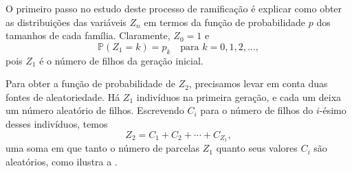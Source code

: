 \documentclass[12pt,portuguese]{article}
\theoremstyle{definition}
\theoremstyle{plainexercise}
\theoremstyle{starredexercise}
\theoremstyle{definition}
\begin{document}
O primeiro passo no estudo deste processo de ramificação é explicar como
obter as distribuições das variáveis $Z_n$ em termos da função de
probabilidade $p$ dos tamanhos de cada família. Claramente, $Z_0=1$ e
\begin{equation}\label{eq:zn-um}
\mathbb{P}(Z_1=k)=p_k
\quad\text{para } k=0,1,2,\ldots,
\end{equation}
pois $Z_1$ é o número de filhos da geração inicial.

Para obter a função de probabilidade de $Z_2$, precisamos levar em conta
duas fontes de aleatoriedade. Há $Z_1$ indivíduos na primeira geração, e
cada um deixa um número aleatório de filhos. Escrevendo $C_i$ para o
número de filhos do $i$-ésimo desses indivíduos, temos
\[
Z_2=C_1+C_2+\cdots+C_{Z_1},
\]
uma soma em que tanto o número de parcelas $Z_1$ quanto seus valores $C_i$
são aleatórios, como ilustra a .
\end{document}
